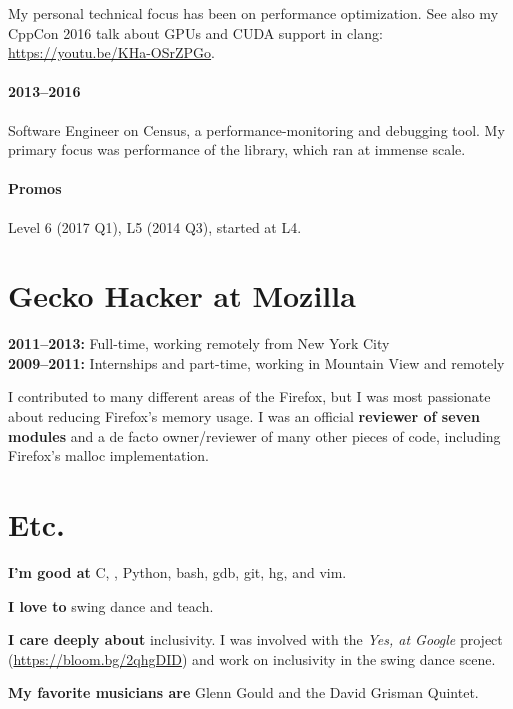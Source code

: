 \documentclass[12pt]{article}
\makeatletter
\DeclareRobustCommand{\Cpp}
{\valign{\vfil\hbox{##}\vfil\cr
   {C\kern-.05em}\cr
   $\hbox{\fontsize{\sf@size}{0}\textbf{+\kern-0.05em+}}$\cr}%
}
\makeatother
\begin{document}
My personal technical focus has been on performance optimization.  See also my
CppCon 2016 talk about GPUs and CUDA support in clang:
\url{https://youtu.be/KHa-OSrZPGo}.

\paragraph{2013--2016} Software Engineer on Census, a performance-monitoring
and debugging tool.  My primary focus was performance of the library, which ran
at immense scale.

\paragraph{Promos} Level 6 (2017 Q1), L5 (2014 Q3), started at L4.

\section*{Gecko Hacker at Mozilla}
\textbf{2011--2013:} Full-time, working remotely from New York City\\
\textbf{2009--2011:} Internships and part-time, working in Mountain View and
remotely

I contributed to many different areas of the Firefox, but I was most passionate
about reducing Firefox's memory usage.  I was an official \textbf{reviewer of
seven modules} and a de facto owner/reviewer of many other pieces of code,
including Firefox's malloc implementation.

\begin{comment}
In the period between Jan.~1, 2012 and May~15, 2013, I was the \textbf{\nth{13}
most-prolific author} and the \textbf{\nth{15} most-prolific reviewer} of
commits in Mozilla's main source repository, out of \textasciitilde350 contributors
with more than 10 commits in this period.  Only three people both wrote and
reviewed more patches during this time.

git log --no-merges --since=01-01-2012 --pretty="%

git log --since=01-01-2012 --pretty=%
\end{comment}

\section*{Etc.}
\textbf{I'm good at} C, \Cpp, Python, bash, gdb, git, hg, and vim.

\textbf{I love to} swing dance and teach.

\textbf{I care deeply about} inclusivity.  I was involved with the \textit{Yes, at Google} project (\url{https://bloom.bg/2qhgDID}) and work on inclusivity in the swing dance scene.

\textbf{My favorite musicians are} Glenn Gould and the David Grisman Quintet.
\end{document}

